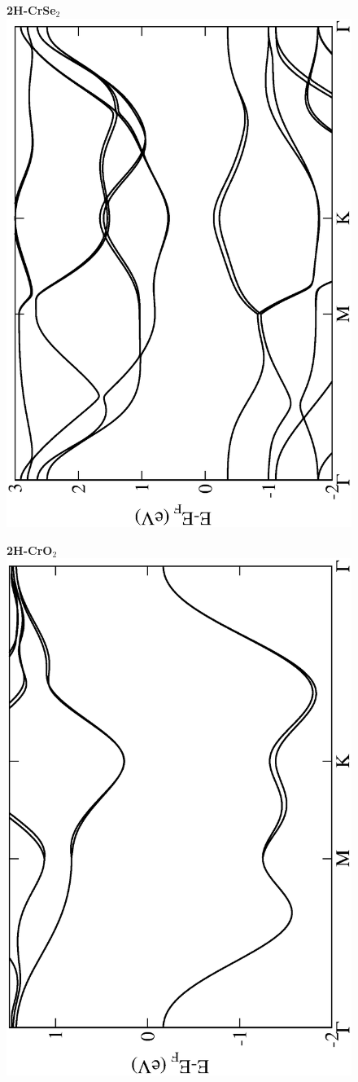 \begin{figure}[htbp]
\centering
{\bfseries \sffamily 2H-CrSe$_{2}$}\\
\includegraphics[width=0.45\linewidth, angle=-90, trim={2.9cm, 0cm, 2cm, 0cm}, clip]{img/SI_figs/BS/2H-CrSe2.eps}
\end{figure}

\begin{figure}[htbp]
\centering
{\bfseries \sffamily 2H-CrO$_{2}$}\\
\includegraphics[width=0.45\linewidth, angle=-90, trim={2.9cm, 0cm, 2cm, 0cm}, clip]{img/SI_figs/BS/2H-CrO2.eps}
\end{figure}

% 